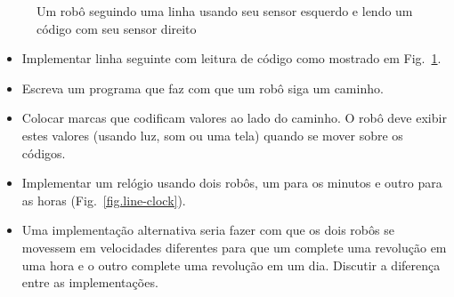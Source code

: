 \begin{figure}
\begin{center}
\end{center}
\caption{Um robô seguindo uma linha usando seu sensor esquerdo e lendo um código com seu sensor direito}\label{fig.code-line}
\end{figure}

\begin{framed}
\begin{itemize}
\item Implementar linha seguinte com leitura de código como mostrado em Fig.~\ref{fig.code-line}.
\item Escreva um programa que faz com que um robô siga um caminho.
\item Colocar marcas que codificam valores ao lado do caminho. O robô deve exibir estes valores (usando luz, som ou uma tela) quando se mover sobre os códigos.
\end{itemize}
\end{framed}

\begin{framed}
\begin{itemize}
\item Implementar um relógio usando dois robôs, um para os minutos e outro para as horas (Fig.~\ref{fig.line-clock}).
\item Uma implementação alternativa seria fazer com que os dois robôs se movessem em velocidades diferentes para que um complete uma revolução em uma hora e o outro complete uma revolução em um dia. Discutir a diferença entre as implementações.
\end{itemize}
\end{framed}

